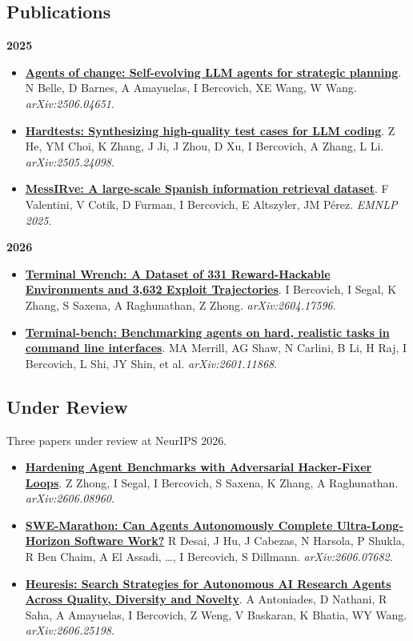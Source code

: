 \documentclass[a4paper,10pt]{article}
\begin{document}
\subsection*{Publications}

\noindent\textbf{2025}
\begin{itemize}[leftmargin=*, itemsep=2pt, topsep=2pt]
  \item \href{https://arxiv.org/abs/2506.04651}{\textbf{Agents of change: Self-evolving LLM agents for strategic planning}}. N Belle, D Barnes, A Amayuelas, I Bercovich, XE Wang, W Wang. \textit{arXiv:2506.04651}.
  \item \href{https://arxiv.org/abs/2505.24098}{\textbf{Hardtests: Synthesizing high-quality test cases for LLM coding}}. Z He, YM Choi, K Zhang, J Ji, J Zhou, D Xu, I Bercovich, A Zhang, L Li. \textit{arXiv:2505.24098}.
  \item \href{https://arxiv.org/abs/2409.05994}{\textbf{MessIRve: A large-scale Spanish information retrieval dataset}}. F Valentini, V Cotik, D Furman, I Bercovich, E Altszyler, JM P\'erez. \textit{EMNLP 2025}.
\end{itemize}

\vspace{3pt}
\noindent\textbf{2026}
\begin{itemize}[leftmargin=*, itemsep=2pt, topsep=2pt]
  \item \href{https://arxiv.org/abs/2604.17596}{\textbf{Terminal Wrench: A Dataset of 331 Reward-Hackable Environments and 3,632 Exploit Trajectories}}. I Bercovich, I Segal, K Zhang, S Saxena, A Raghunathan, Z Zhong. \textit{arXiv:2604.17596}.
  \item \href{https://arxiv.org/abs/2601.11868}{\textbf{Terminal-bench: Benchmarking agents on hard, realistic tasks in command line interfaces}}. MA Merrill, AG Shaw, N Carlini, B Li, H Raj, I Bercovich, L Shi, JY Shin, et al. \textit{arXiv:2601.11868}.
\end{itemize}

\subsection*{Under Review}
\noindent Three papers under review at NeurIPS 2026.
\begin{itemize}[leftmargin=*, itemsep=2pt, topsep=2pt]
  \item \href{https://arxiv.org/abs/2606.08960}{\textbf{Hardening Agent Benchmarks with Adversarial Hacker-Fixer Loops}}. Z Zhong, I Segal, I Bercovich, S Saxena, K Zhang, A Raghunathan. \textit{arXiv:2606.08960}.
  \item \href{https://arxiv.org/abs/2606.07682}{\textbf{SWE-Marathon: Can Agents Autonomously Complete Ultra-Long-Horizon Software Work?}} R Desai, J Hu, J Cabezas, N Harsola, P Shukla, R Ben Chaim, A El Assadi, \ldots, I Bercovich, S Dillmann. \textit{arXiv:2606.07682}.
  \item \href{https://arxiv.org/abs/2606.25198}{\textbf{Heuresis: Search Strategies for Autonomous AI Research Agents Across Quality, Diversity and Novelty}}. A Antoniades, D Nathani, R Saha, A Amayuelas, I Bercovich, Z Weng, V Baskaran, K Bhatia, WY Wang. \textit{arXiv:2606.25198}.
\end{itemize}
\end{document}

